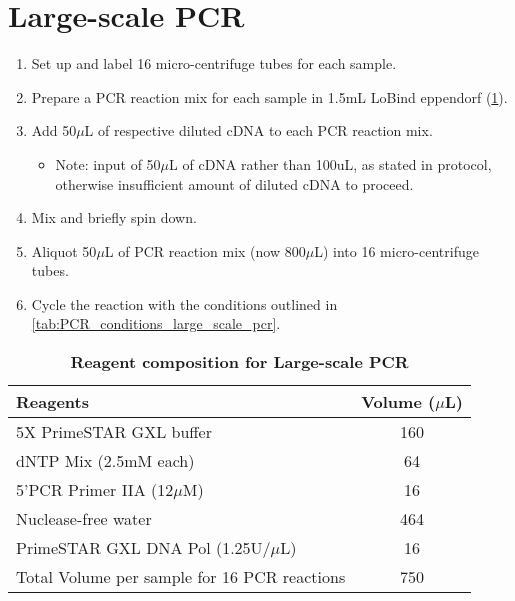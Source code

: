 \section{Large-scale PCR} 
\label{Isoseq_Protocol_largescalepcr}
\begin{enumerate}
	\item Set up and label 16 micro-centrifuge tubes for each sample. 
	\item Prepare a PCR reaction mix for each sample in 1.5mL LoBind eppendorf (\cref{tab:large_scale_pcr}).
	\item Add 50$\mu$L of respective diluted cDNA to each PCR reaction mix. 
	\begin{itemize}
		\item Note: input of 50$\mu$L of cDNA rather than 100uL, as stated in protocol, otherwise insufficient amount of diluted cDNA to proceed.
	\end{itemize}
	\item Mix and briefly spin down.
	\item Aliquot 50$\mu$L of PCR reaction mix (now 800$\mu$L) into 16 micro-centrifuge tubes.
	\item Cycle the reaction with the conditions outlined in \cref{tab:PCR_conditions_large_scale_pcr}.
\end{enumerate}

\vspace{1cm}
\begin{table}[ht]
	\centering
	\caption[Large-scale PCR]%
	{\textbf{Reagent composition for Large-scale PCR}}
	\label{tab:large_scale_pcr}
	\begin{tabularx}{0.8\textwidth}{lc}
		\toprule 
		Reagents                                     & Volume ($\mu$L) \\ \midrule
		5X PrimeSTAR GXL buffer                      & 160         \\
		dNTP Mix (2.5mM each)                        & 64          \\
		5'PCR Primer IIA (12$\mu$M)                      & 16          \\
		Nuclease-free water                          & 464         \\
		PrimeSTAR GXL DNA Pol (1.25U/$\mu$L)             & 16          \\
		Total Volume per sample for 16 PCR reactions & 750 \\
		\bottomrule        
	\end{tabularx}
\end{table}

